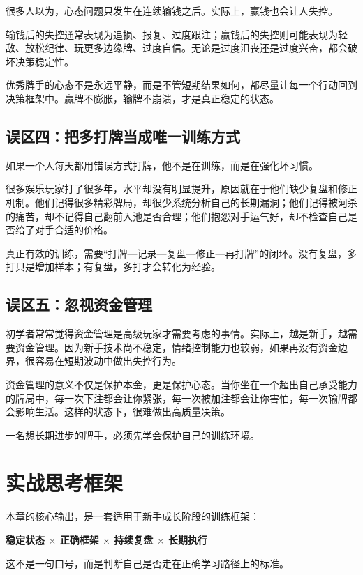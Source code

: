 很多人以为，心态问题只发生在连续输钱之后。实际上，赢钱也会让人失控。

输钱后的失控通常表现为追损、报复、过度跟注；赢钱后的失控则可能表现为轻敌、放松纪律、玩更多边缘牌、过度自信。无论是过度沮丧还是过度兴奋，都会破坏决策稳定性。

优秀牌手的心态不是永远平静，而是不管短期结果如何，都尽量让每一个行动回到决策框架中。赢牌不膨胀，输牌不崩溃，才是真正稳定的状态。

\subsection{误区四：把多打牌当成唯一训练方式}

如果一个人每天都用错误方式打牌，他不是在训练，而是在强化坏习惯。

很多娱乐玩家打了很多年，水平却没有明显提升，原因就在于他们缺少复盘和修正机制。他们记得很多精彩牌局，却很少系统分析自己的长期漏洞；他们记得被河杀的痛苦，却不记得自己翻前入池是否合理；他们抱怨对手运气好，却不检查自己是否给了对手合适的价格。

真正有效的训练，需要“打牌—记录—复盘—修正—再打牌”的闭环。没有复盘，多打只是增加样本；有复盘，多打才会转化为经验。

\subsection{误区五：忽视资金管理}

初学者常常觉得资金管理是高级玩家才需要考虑的事情。实际上，越是新手，越需要资金管理。因为新手技术尚不稳定，情绪控制能力也较弱，如果再没有资金边界，很容易在短期波动中做出失控行为。

资金管理的意义不仅是保护本金，更是保护心态。当你坐在一个超出自己承受能力的牌局中，每一次下注都会让你紧张，每一次被加注都会让你害怕，每一次输牌都会影响生活。这样的状态下，很难做出高质量决策。

一名想长期进步的牌手，必须先学会保护自己的训练环境。

\section{实战思考框架}

本章的核心输出，是一套适用于新手成长阶段的训练框架：

\begin{center}
\textbf{稳定状态 $\times$ 正确框架 $\times$ 持续复盘 $\times$ 长期执行}
\end{center}

这不是一句口号，而是判断自己是否走在正确学习路径上的标准。

